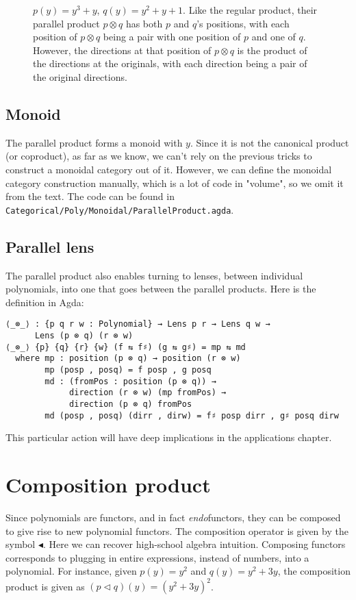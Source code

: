 \begin{figure}[H]
    \caption{$p(y) = y^3 + y$, $q(y) = y^2 + y + 1$. Like the regular product, their parallel product $p \otimes q$ has both $p$ and $q$'s positions, with each  position of $p \otimes q$ being a pair with one position of $p$ and one of $q$. However, the directions at that position of $p \otimes q$ is the product of the directions at the originals, with each direction being a pair of the original directions.}
    \label{fig:parallelProductExample}
\end{figure}


\subsection{Monoid}

The parallel product forms a monoid with $y$. Since it is not the canonical product (or coproduct), as far as we know, we can't rely on the previous tricks to construct a monoidal category out of it. However, we can define the monoidal category construction manually, which is a lot of code in "volume", so we omit it from the text. The code can be found in \texttt{Categorical/Poly/Monoidal/ParallelProduct.agda}.

\subsection{Parallel lens}

The parallel product also enables turning to lenses, between individual polynomials, into one that goes between the parallel products. Here is the definition in Agda:

\begin{verbatim}
⟨_⊗_⟩ : {p q r w : Polynomial} → Lens p r → Lens q w → 
      Lens (p ⊗ q) (r ⊗ w)
⟨_⊗_⟩ {p} {q} {r} {w} (f ⇆ f♯) (g ⇆ g♯) = mp ⇆ md
  where mp : position (p ⊗ q) → position (r ⊗ w)
        mp (posp , posq) = f posp , g posq
        md : (fromPos : position (p ⊗ q)) → 
             direction (r ⊗ w) (mp fromPos) → 
             direction (p ⊗ q) fromPos
        md (posp , posq) (dirr , dirw) = f♯ posp dirr , g♯ posq dirw
\end{verbatim}

This particular action will have deep implications in the applications chapter.

\section{Composition product}
\label{section:composition}
Since polynomials are functors, and in fact \textit{endo}functors, they can be composed to give rise to new polynomial functors. The composition operator is given by the symbol ◂. Here we can recover high-school algebra intuition. Composing functors corresponds to plugging in entire expressions, instead of numbers, into a polynomial. For instance, given $p(y) = y^2$ and $q(y) = y^2 + 3y$, the composition product is given as $(p \triangleleft q)(y) = (y^2 + 3y)^2$.

